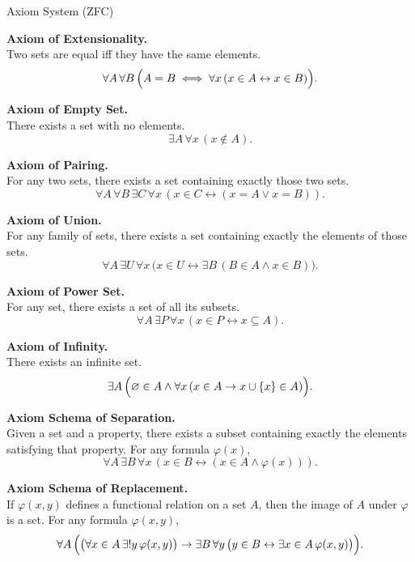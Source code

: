\begin{axiombox}{Axiom System (ZFC)}

\textbf{Axiom of Extensionality.}\label{ax:extensionality}\\
Two sets are equal iff they have the same elements.
\[
\forall A \, \forall B \,
\Bigl( A = B \iff \forall x \, (x \in A \leftrightarrow x \in B) \Bigr).
\]

\medskip
\textbf{Axiom of Empty Set.}\label{ax:empty-set}\\
There exists a set with no elements.
\[
\exists A \, \forall x \, (x \notin A).
\]

\medskip
\textbf{Axiom of Pairing.}\label{ax:pairing}\\
For any two sets, there exists a set containing exactly those two sets.
\[
\forall A \, \forall B \, \exists C \,
\forall x \, (x \in C \leftrightarrow (x = A \lor x = B)).
\]

\medskip
\textbf{Axiom of Union.}\label{ax:union}\\
For any family of sets, there exists a set containing exactly the elements of
those sets.
\[
\forall A \, \exists U \,
\forall x \,
\bigl( x \in U \leftrightarrow \exists B \, (B \in A \land x \in B) \bigr).
\]

\medskip
\textbf{Axiom of Power Set.}\label{ax:power-set}\\
For any set, there exists a set of all its subsets.
\[
\forall A \, \exists P \,
\forall x \, (x \in P \leftrightarrow x \subseteq A).
\]

\medskip
\textbf{Axiom of Infinity.}\label{ax:infinity}\\
There exists an infinite set.
\[
\exists A \,
\Bigl( \varnothing \in A \land
\forall x \, (x \in A \rightarrow x \cup \{x\} \in A) \Bigr).
\]

\medskip
\textbf{Axiom Schema of Separation.}\label{ax:separation}\\
Given a set and a property, there exists a subset containing exactly the
elements satisfying that property. For any formula $\varphi(x)$,
\[
\forall A \, \exists B \,
\forall x \, (x \in B \leftrightarrow (x \in A \land \varphi(x))).
\]

\medskip
\textbf{Axiom Schema of Replacement.}\label{ax:replacement}\\
If $\varphi(x,y)$ defines a functional relation on a set $A$, then the image
of $A$ under $\varphi$ is a set. For any formula $\varphi(x,y)$,
\[
\forall A\,
\Bigl(
\bigl(\forall x \in A\, \exists! y\, \varphi(x,y)\bigr)
\rightarrow
\exists B\, \forall y\,
\bigl(y \in B \leftrightarrow \exists x \in A\, \varphi(x,y)\bigr)
\Bigr).
\]


\end{axiombox}
